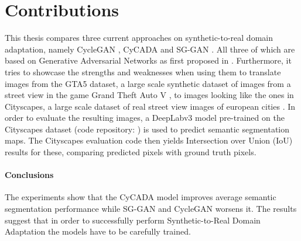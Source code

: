 \section{Contributions}
This thesis compares three current approaches on synthetic-to-real domain adaptation, namely CycleGAN \cite{DBLP:journals/corr/ZhuPIE17}, CyCADA \cite{DBLP:journals/corr/abs-1711-03213} and SG-GAN \cite{DBLP:journals/corr/abs-1801-01726}. All three of which are based on Generative Adversarial Networks as first proposed in \cite{NIPS2014_5423}. Furthermore, it tries to showcase the strengths and weaknesses when using them to translate images from the GTA5 dataset, a large scale synthetic dataset of images from a street view in the game Grand Theft Auto V \cite{Richter_2016_ECCV}, to images looking like the ones in Cityscapes, a large scale dataset of real street view images of european cities \cite{Cordts_2016_CVPR}. In order to evaluate the resulting images, a DeepLabv3 \cite{DBLP:journals/corr/ChenPSA17} model pre-trained on the Cityscapes dataset (code repository: \cite{DLR}) is used to predict semantic segmentation maps. The Cityscapes evaluation code \cite{CSR} then yields Intersection over Union (IoU) results for these, comparing predicted pixels with ground truth pixels. 
\paragraph{Conclusions} The experiments show that the CyCADA model improves average semantic segmentation performance while SG-GAN and CycleGAN worsens it. The results suggest that in order to successfully perform Synthetic-to-Real Domain Adaptation the models have to be carefully trained.